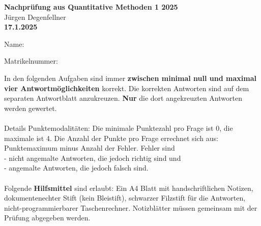 \documentclass[10pt,addpoints,answers]{exam}
\begin{document}
\begin{center}
\textbf{\Huge Nachprüfung aus Quantitative Methoden 1 2025} \\
\vspace{0.5cm}
Jürgen Degenfellner\\
\vspace{0.5cm}
\textbf{\large 17.1.2025}
\end{center}
\vspace{1cm}

\noindent Name:  \\
    
\vspace{5mm} %

\noindent Matrikelnummer: 

\vspace{10mm}

\noindent In den folgenden Aufgaben sind immer \textbf{zwischen minimal null und maximal vier Antwortmöglichkeiten} korrekt. Die korrekten Antworten sind auf dem separaten Antwortblatt anzukreuzen. \textbf{Nur} die dort angekreuzten Antworten werden gewertet. \\
\\
Details Punktemodalitäten: Die minimale Punktezahl pro Frage ist 0, die maximale ist 4. Die Anzahl der Punkte pro Frage errechnet sich aus: Punktemaximum minus Anzahl der Fehler. Fehler sind \\
 - nicht angemalte Antworten, die jedoch richtig sind und \\
 - angemalte Antworten, die jedoch falsch sind. \\
\\
Folgende \textbf{Hilfsmittel} sind erlaubt: Ein A4 Blatt mit handschriftlichen Notizen, dokumentenechter Stift (kein Bleistift), schwarzer Filzstift für die Antworten, nicht-programmierbarer Taschenrechner. Notizblätter müssen gemeinsam mit der Prüfung abgegeben werden. 
\vspace{1cm}
\end{document}
